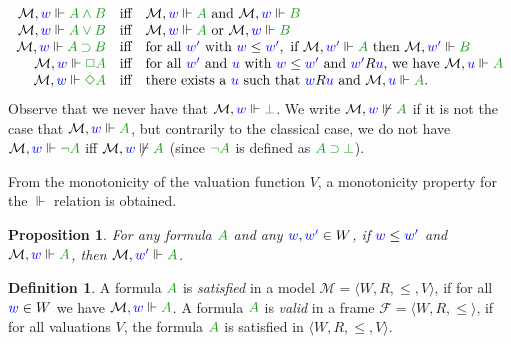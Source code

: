 \documentclass[a4paper]{article}
\theoremstyle{plain}
\newtheorem{proposition}[theorem]{Proposition}
\theoremstyle{definition}
\newtheorem{definition}[theorem]{Definition}
\newcommand*{\AND}{\mathbin{\wedge}}
\newcommand*{\OR}{\mathbin{\vee}}
\newcommand*{\IMP}{\mathbin{\supset}}%
\newcommand*{\BOX}{\mathord{\Box}}
\newcommand*{\DIA}{\mathord{\Diamond}}
\newcommand*{\fm}[1]{{\color{notgreen}{#1}}}
\newcommand*{\lb}[1]{{\color{blue}{#1}}}
\newcommand*{\rel}{R}
\newcommand*{\accs}[2]{\lb{#1}R\lb{#2}}
\newcommand*{\futs}[2]{\lb{#1}\le{\lb{#2}}}
\newcommand{\M}{\mathcal{M}}
\newcommand{\F}{\mathcal{F}}
\begin{document}
 \begin{equation}\label{eq:kripke}
 \begin{array}{rcl}
 \M, \lb w \Vdash \fm{A \AND B} & \mbox{iff} & \M, \lb w \Vdash \fm A \mbox{ and } \M, \lb w \Vdash \fm B\\
 
 \M, \lb w \Vdash \fm{A \OR B} & \mbox{iff} & \M, \lb w \Vdash \fm A \mbox{ or } \M, \lb w \Vdash \fm B\\
 
 \M, \lb w \Vdash \fm{A \IMP B} & \mbox{iff} & \mbox{for all } \lb{w'} \mbox{ with } \futs w{w'}, \mbox{ if } \M, \lb{w'} \Vdash \fm A \mbox{ then } \M, \lb{w'} \Vdash \fm B\\
 
 \M, \lb w \Vdash \fm{\BOX A} & \mbox{iff} & \mbox{for all } \lb{w'} \mbox{ and } \lb u \mbox{ with } \futs w{w'} \mbox{ and } \accs {w'}u \mbox{, we have } \M, \lb u \Vdash \fm A \hfill \\ %
 
 \M, \lb w \Vdash \fm{\DIA A} & \mbox{iff} & \mbox{there exists a } \lb u \mbox{ such that } \accs wu \mbox{ and } \M, \lb u \Vdash \fm A.
 
 \end{array}
 \end{equation}
 Observe that we never have that $\M, \lb w \Vdash \fm\bot$. 
 We write $\M, \lb w \not\Vdash \fm A$ if it is not the case that $\M, \lb w \Vdash \fm A$, but contrarily to the classical case, we do not have $\M, \lb w \Vdash \fm{\neg A}$ iff $\M, \lb w \not\Vdash \fm A$ (since $\fm{\neg A}$ is defined as $\fm{A \IMP \bot}$).
 
 From the monotonicity of the valuation function $V$, a monotonicity property for the $\Vdash$ relation is obtained.
 \begin{proposition}%
 	For any formula $\fm A$ and any $\lb w, \lb{w'} \in W$, if $\futs w{w'}$ and $\M, \lb w \Vdash \fm A$, then $\M, \lb{w'} \Vdash \fm A$.
 \end{proposition}
 
 
 
 \begin{definition}
 	A formula $\fm A$ is \emph{satisfied} in a model $\M = \langle W, \rel, \le, V \rangle$, if for all $\lb w \in W$ we have $\M, \lb w \Vdash \fm A$.
 	A formula $\fm A$ is \emph{valid} in a frame $\F = \langle W, \rel, \le \rangle$, if for all valuations $V$, the formula $\fm A$ is satisfied in $\langle W, R, \le, V \rangle$.
 \end{definition}
 
\end{document}
